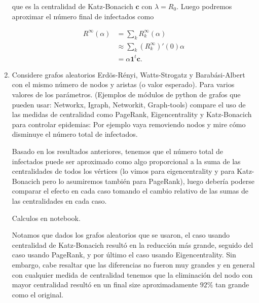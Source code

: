 \documentclass[answers]{exam}
\begin{document}
\begin{questions}
\begin{enumerate}
\begin{solution}
que es la centralidad de Katz-Bonacich $\mathbf{c}$ con $\lambda = R_0$. Luego podremos aproximar el número final de infectados como

\begin{align*}
    R^\infty(\alpha) &= \sum_kR^\infty_k(\alpha)\\
    &\approx \sum_k(R^\infty_k)'(0)\alpha\\
    &= \alpha\mathbf{1}^t\mathbf{c}.
\end{align*}
\end{solution}

\item Considere grafos aleatorios Erdös-Rényi, Watts-Strogatz y Barabási-Albert con el mismo número de nodos y aristas (o valor esperado). Para varios valores de los parámetros. (Ejemplos de módulos de python de grafos que pueden usar: Networkx, Igraph, Networkit, Graph-tools) compare el uso de las medidas de centralidad como PageRank, Eigencentrality y Katz-Bonacich para controlar epidemias: Por ejemplo vaya removiendo nodos y mire cómo disminuye el número total de infectados.

\begin{solution}
Basado en los resultados anteriores, tenemos que el número total de infectados puede ser aproximado como algo proporcional a la suma de las centralidades de todos los vértices (lo vimos para eigencentrality y para Katz-Bonacich pero lo asumiremos también para PageRank), luego debería poderse comparar el efecto en cada caso tomando el cambio relativo de las sumas de las centralidades en cada caso.

Calculos en notebook.

Notamos que dados los grafos aleatorios que se usaron, el caso usando centralidad de Katz-Bonacich resultó en la reducción más grande, seguido del caso usando PageRank, y por último el caso usando Eigencentrality. Sin embargo, cabe resaltar que las diferencias no fueron muy grandes y en general con cualquier medida de centralidad tenemos que la eliminación del nodo con mayor centralidad resultó en un final size aproximadamente $92\%$ tan grande como el original.
\end{solution}

\end{enumerate}

\end{questions}
\end{document}
